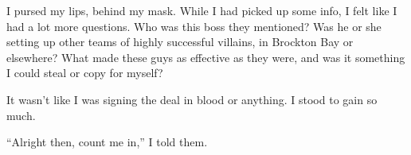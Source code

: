 I pursed my lips, behind my mask.  While I had picked up some info, I felt like I had a lot more questions.  Who was this boss they mentioned?  Was he or she setting up other teams of highly successful villains, in Brockton Bay or elsewhere?  What made these guys as effective as they were, and was it something I could steal or copy for myself?



It wasn't like I was signing the deal in blood or anything.  I stood to gain so much.



``Alright then, count me in,'' I told them.






